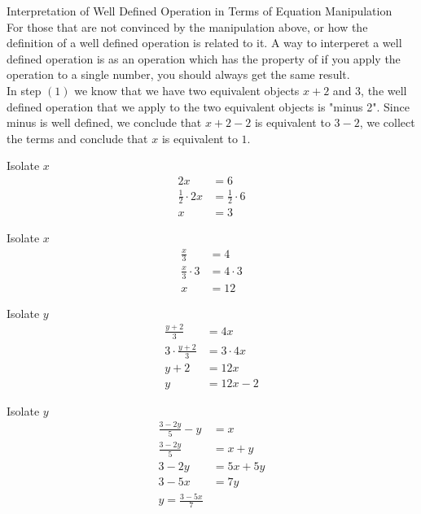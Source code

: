 \documentclass{book}
\begin{document}
  {\remark Interpretation of Well Defined Operation in Terms of Equation Manipulation \\
    For those that are not convinced by the manipulation above, or how the definition of a well defined operation is related to it. A way to interperet a well defined operation is as an operation which has the property of if you apply the operation to a single number, you should always get the same result.\\

     In step $(1)$ we know that we have two equivalent objects $x + 2$ and $3$, the well defined operation that we apply to the two equivalent objects is "minus 2". Since minus is well defined, we conclude that $x + 2 - 2$ is equivalent to $3 - 2$, we collect the terms and conclude that $x$ is equivalent to $1$.\\
  }

  {\example Isolate $x$ \\
    \begin{align*}
      2x & = 6\\
      \frac{1}{2} \cdot 2x & = \frac{1}{2} \cdot 6\\
      x & = 3
    \end{align*}
  }

  {\example Isolate $x$ \\
    \begin{align*}
      \frac{x}{3} & = 4\\
      \frac{x}{3} \cdot 3 & = 4 \cdot 3\\
      x & = 12
    \end{align*}
  }

  {\example Isolate $y$ \\
    \begin{align*}
      \frac{y + 2}{3} & = 4x\\
      3 \cdot \frac{y + 2}{3} & = 3 \cdot 4x\\
      y + 2 & = 12x\\
      y & = 12x - 2
    \end{align*}
  }

  {\example Isolate $y$ \\
    \begin{align*}
      \frac{3 - 2y}{5} - y & = x\\
      \frac{3 - 2y}{5} & = x + y\\
      3 - 2y & = 5x + 5y\\
      3 - 5x & = 7y\\
      y = \frac{3 - 5x}{7}
    \end{align*}
  }
\end{document}
